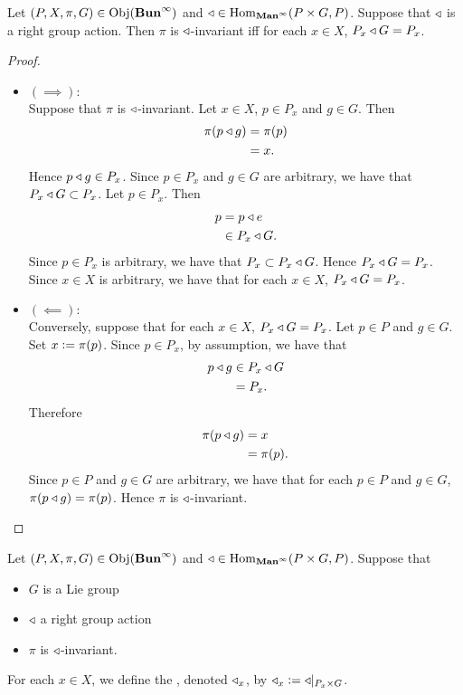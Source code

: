 \documentclass{book}
\begin{document}
\begin{ex}
	Let $(P, X, \pi, G) \in \operatorname{Obj}(\operatorname*{\text{\textbf{Bun}}^{\infty}})$ and $\triangleleft \in \operatorname{Hom}_{\operatorname*{\text{\textbf{Man}}^{\infty}}}(P \times G, P)$. Suppose that $\triangleleft$ is a right group action. Then $\pi$ is $\triangleleft$-invariant iff for each $x \in X$, $P_x \triangleleft G = P_x$.
\end{ex}

\begin{proof}\
	\begin{itemize}
		\item $(\implies):$ \\
		Suppose that $\pi$ is $\triangleleft$-invariant. Let $x \in X$, $p \in P_x$ and $g \in G$. Then 
		\begin{align*}
			\pi(p \triangleleft g)
			& = \pi(p) \\
			& = x.
		\end{align*}
		Hence $p \triangleleft g \in P_x$. Since $p \in P_x$ and $g \in G$ are arbitrary, we have that $P_x \triangleleft G \subset P_x$. Let $p \in P_x$. Then 
		\begin{align*}
			p
			& = p \triangleleft e \\
			& \in P_x \triangleleft G.
		\end{align*}
		Since $p \in P_x$ is arbitrary, we have that $P_x \subset P_x \triangleleft G$. Hence $P_x \triangleleft G = P_x$. Since $x \in X$ is arbitrary, we have that for each $x \in X$, $P_x \triangleleft G = P_x$.
		\item $(\impliedby):$ \\
		Conversely, suppose that for each $x \in X$, $P_x \triangleleft G = P_x$. Let $p \in P$ and $g \in G$. Set $x \vcentcolon= \pi(p)$. Since $p \in P_x$, by assumption, we have that
		\begin{align*}
			p \triangleleft g 
			& \in P_x \triangleleft G \\
			& = P_x.
		\end{align*}
		Therefore
		\begin{align*}
			\pi(p \triangleleft g) 
			& = x \\
			& = \pi(p).
		\end{align*}
		Since $p \in P$ and $g \in G$ are arbitrary, we have that for each $p \in P$ and $g \in G$, $\pi(p \triangleleft g) = \pi(p)$. Hence $\pi$ is $\triangleleft$-invariant.
	\end{itemize}
\end{proof}

\begin{defn}
	Let $(P, X, \pi, G) \in \operatorname{Obj}(\operatorname*{\text{\textbf{Bun}}^{\infty}})$ and $\triangleleft \in \operatorname{Hom}_{\operatorname*{\text{\textbf{Man}}^{\infty}}}(P \times G, P)$. Suppose that
	\begin{itemize}
		\item $G$ is a Lie group 
		\item $\triangleleft$ a right group action
		\item $\pi$ is $\triangleleft$-invariant.
	\end{itemize} 
	For each $x \in X$, we define the , denoted $\triangleleft_x$, by $\triangleleft_x \vcentcolon= \triangleleft|_{P_x \times G}$. 
\end{defn}
\end{document}
